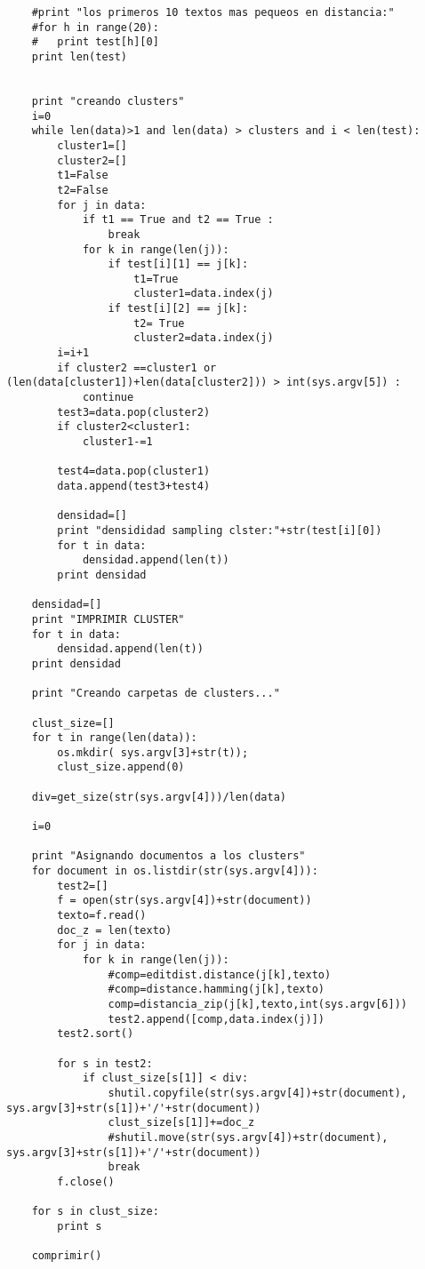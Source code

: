\begin{lstlisting}
	#print "los primeros 10 textos mas pequeos en distancia:"
	#for h in range(20):
	#	print test[h][0]
	print len(test)	
		
		
	print "creando clusters"
	i=0
	while len(data)>1 and len(data) > clusters and i < len(test):
		cluster1=[]
		cluster2=[]
		t1=False
		t2=False
		for j in data:
			if t1 == True and t2 == True :
				break
			for k in range(len(j)):
				if test[i][1] == j[k]:
					t1=True
					cluster1=data.index(j)
				if test[i][2] == j[k]:
					t2= True
					cluster2=data.index(j)
		i=i+1
		if cluster2 ==cluster1 or (len(data[cluster1])+len(data[cluster2])) > int(sys.argv[5]) : 
			continue
		test3=data.pop(cluster2)		
		if cluster2<cluster1:
			cluster1-=1
				
		test4=data.pop(cluster1)
		data.append(test3+test4)
		
		densidad=[]		
		print "densididad sampling clster:"+str(test[i][0])
		for t in data:
			densidad.append(len(t))
		print densidad
		
	densidad=[]		
	print "IMPRIMIR CLUSTER"
	for t in data:
		densidad.append(len(t))
	print densidad
	
	print "Creando carpetas de clusters..."
	
	clust_size=[]
	for t in range(len(data)):
		os.mkdir( sys.argv[3]+str(t));
		clust_size.append(0)

	div=get_size(str(sys.argv[4]))/len(data)
		
	i=0
	
	print "Asignando documentos a los clusters"
	for document in os.listdir(str(sys.argv[4])):		
		test2=[]
		f = open(str(sys.argv[4])+str(document))		
		texto=f.read()
		doc_z = len(texto)
		for j in data:
			for k in range(len(j)):
				#comp=editdist.distance(j[k],texto)
				#comp=distance.hamming(j[k],texto)	
				comp=distancia_zip(j[k],texto,int(sys.argv[6]))	
				test2.append([comp,data.index(j)])	          
		test2.sort()
		
		for s in test2:
			if clust_size[s[1]] < div:
				shutil.copyfile(str(sys.argv[4])+str(document), sys.argv[3]+str(s[1])+'/'+str(document))
				clust_size[s[1]]+=doc_z
				#shutil.move(str(sys.argv[4])+str(document), sys.argv[3]+str(s[1])+'/'+str(document))	
				break
		f.close()
	
	for s in clust_size:
		print s
	
	comprimir()	
	
	



\end{lstlisting}




